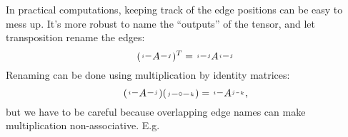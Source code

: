 In practical computations, keeping track of the edge positions can be easy to mess up.
It's more robust to name the ``outputs'' of the tensor, and let transposition rename the edges:
\[
   (\begin{tikzpicture}[baseline=(A.base), inner sep=1pt]
   \node (A) {$A$};
   \draw (A.west) -- ++(-.2,0) node[left, font=\tiny] {$i$};
   \draw (A.east) -- ++(.2,0) node[right, font=\tiny] {$j$};
\end{tikzpicture})^T
=
\begin{tikzpicture}[baseline=(A.base), inner sep=1pt]
   \node (A) {$A$};
   \node[font=\tiny] (i) at (-.2,0) {$j$};
   \node[font=\tiny] (j) at (.2,0) {$i$};
   \draw (i.west) -- ++(-.2,0) node[left, font=\tiny] {$i$};
   \draw (j.east) -- ++(.2,0) node[right, font=\tiny] {$j$};
\end{tikzpicture}
\]
%
Renaming can be done using multiplication by identity matrices:
\[
(\begin{tikzpicture}[baseline=(A.base), inner sep=1pt]
   \node (A) {$A$};
   \draw (A.west) -- ++(-.2,0) node[left, font=\tiny] {$i$};
   \draw (A.east) -- ++(.2,0) node[right, font=\tiny] {$j$};
\end{tikzpicture})
(
\begin{tikzpicture}[baseline=(A.base), inner sep=1pt]
   \node (A) {$\sbullet$};
   \draw (A.west) -- ++(-.2,0) node[left, font=\tiny] {$j$};
   \draw (A.east) -- ++(.2,0) node[right, font=\tiny] {$k$};
\end{tikzpicture})
=
\begin{tikzpicture}[baseline=(A.base), inner sep=1pt]
   \node (A) {$A$};
   \draw (A.west) -- ++(-.2,0) node[left, font=\tiny] {$i$};
   \node[font=\tiny] (j) at (.2,0) {$j$};
   \draw (j) -- ++(.2,0) node[right, font=\tiny] {$k$};
\end{tikzpicture},
\]
but we have to be careful because overlapping edge names can make multiplication non-associative.
E.g.
